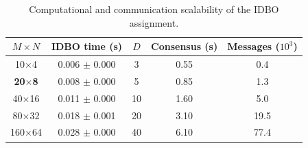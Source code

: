 \begin{table}[!t]
\centering
\small
\setlength{\tabcolsep}{3.5pt}
\caption{Computational and communication scalability of the IDBO assignment.}
\label{tab:idbo_assignment_scale}
\begin{tabular}{ccccc}
\hline\hline
$M\!\times\!N$ & IDBO time (s) & $D$ & Consensus (s) & Messages ($10^3$) \\
\hline
10$\times$4 & 0.006 $\pm$ 0.000 & 3 & 0.55 & 0.4 \\
\textbf{20$\times$8} & 0.008 $\pm$ 0.000 & 5 & 0.85 & 1.3 \\
40$\times$16 & 0.011 $\pm$ 0.000 & 10 & 1.60 & 5.0 \\
80$\times$32 & 0.018 $\pm$ 0.001 & 20 & 3.10 & 19.5 \\
160$\times$64 & 0.028 $\pm$ 0.000 & 40 & 6.10 & 77.4 \\
\hline
\end{tabular}
\end{table}
